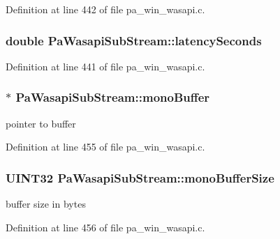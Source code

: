 Definition at line 442 of file pa\+\_\+win\+\_\+wasapi.\+c.

\subsubsection[{\texorpdfstring{latency\+Seconds}{latencySeconds}}]{\setlength{\rightskip}{0pt plus 5cm}double Pa\+Wasapi\+Sub\+Stream\+::latency\+Seconds}\hypertarget{struct_pa_wasapi_sub_stream_a70abfd4a0f3aeef22983dfb49edb20f8}{}\label{struct_pa_wasapi_sub_stream_a70abfd4a0f3aeef22983dfb49edb20f8}


Definition at line 441 of file pa\+\_\+win\+\_\+wasapi.\+c.

\subsubsection[{\texorpdfstring{mono\+Buffer}{monoBuffer}}]{$\ast$ Pa\+Wasapi\+Sub\+Stream\+::mono\+Buffer}\hypertarget{struct_pa_wasapi_sub_stream_a7933875c3daf995e66b0506e7ebb1331}{}\label{struct_pa_wasapi_sub_stream_a7933875c3daf995e66b0506e7ebb1331}


pointer to buffer 



Definition at line 455 of file pa\+\_\+win\+\_\+wasapi.\+c.

\subsubsection[{\texorpdfstring{mono\+Buffer\+Size}{monoBufferSize}}]{\setlength{\rightskip}{0pt plus 5cm}U\+I\+N\+T32 Pa\+Wasapi\+Sub\+Stream\+::mono\+Buffer\+Size}\hypertarget{struct_pa_wasapi_sub_stream_a77cc5c618182aa3fabb0821790b0d11e}{}\label{struct_pa_wasapi_sub_stream_a77cc5c618182aa3fabb0821790b0d11e}


buffer size in bytes 



Definition at line 456 of file pa\+\_\+win\+\_\+wasapi.\+c.

